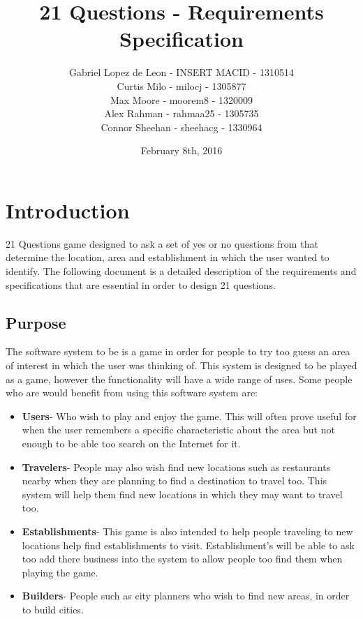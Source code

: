\documentclass[titlepage]{article}
\title{\textbf{21 Questions - Requirements Specification}}
\author{Gabriel Lopez de Leon - INSERT MACID - 1310514\\Curtis Milo - milocj - 1305877\\Max Moore - moorem8 - 1320009\\Alex Rahman - rahmaa25 - 1305735\\Connor Sheehan - sheehacg - 1330964}
\date{February 8th, 2016}
\begin{document}
	
	\maketitle
	\vspace{4cm}	
		\newpage
		\tableofcontents
		\newpage
		\section{Introduction}
		\label{sec:introduction}

		 21 Questions game designed to ask a set of yes or no questions from that determine the location, area and establishment in which the user wanted to identify. The following document is a detailed description of the requirements and specifications that are essential in order to design 21 questions.
		
		\subsection{Purpose}
		\label{sub:purpose}
		
		
			The software system to be is a game in order for people to try too guess an area of interest in which the user was thinking of. This system is designed to be played as a game, however the functionality will have a wide range of uses. Some people who are would benefit from using this software system are:
			
		\begin{itemize}
			
			\item \textbf{Users}- Who wish to play and enjoy the game. This will often prove useful for when the user remembers a specific characteristic about the area but not enough to be able too search on the Internet for it. 
			\item \textbf{Travelers}- People may also wish find new locations such as restaurants nearby when they are planning to find a destination to travel too. This system will help them find new locations in which they may want to travel too.
			\item \textbf{Establishments}- This game is also intended to help people traveling to new locations help find establishments to visit. Establishment's will be able to ask too add there business into the system to allow people too find them when playing the game.
			\item \textbf{Builders}- People such as city planners who wish to find new areas, in order to build cities.
			 
		\end{itemize}
\end{document}
